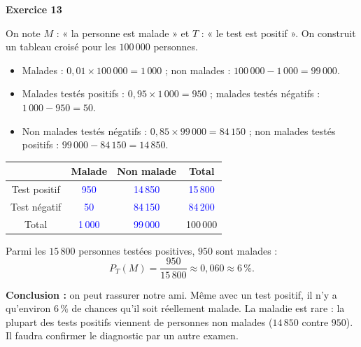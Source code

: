 \documentclass[a4paper,11pt]{article}
\newenvironment{exercice}[1]{%
  \Needspace{6\baselineskip}\par\bigskip\noindent\textbf{Exercice #1}\par\smallskip\noindent\ignorespaces
}{%
  \par
}
\newcommand{\val}[1]{\textcolor{blue}{#1}}
\begin{document}
\begin{exercice}{13}
On note $M$ : « la personne est malade » et $T$ : « le test est positif ». On construit un tableau croisé pour les $100\,000$ personnes.
\begin{itemize}[label=$\bullet$]
\item Malades : $0{,}01\times 100\,000=1\,000$ ; non malades : $100\,000-1\,000=99\,000$.
\item Malades testés positifs : $0{,}95\times 1\,000=950$ ; malades testés négatifs : $1\,000-950=50$.
\item Non malades testés négatifs : $0{,}85\times 99\,000=84\,150$ ; non malades testés positifs : $99\,000-84\,150=14\,850$.
\end{itemize}

\begin{center}
\begin{tabular}{|c|c|c|c|}
\hline
 & Malade & Non malade & Total \\ \hline
Test positif & \val{950} & \val{14\,850} & \val{15\,800} \\ \hline
Test négatif & \val{50} & \val{84\,150} & \val{84\,200} \\ \hline
Total & \val{1\,000} & \val{99\,000} & 100\,000 \\ \hline
\end{tabular}
\end{center}

Parmi les $15\,800$ personnes testées positives, $950$ sont malades :
\[P_T(M)=\dfrac{950}{15\,800}\approx 0{,}060\approx 6\,\%.\]

\textbf{Conclusion :} on peut rassurer notre ami. Même avec un test positif, il n'y a qu'environ $6\,\%$ de chances qu'il soit réellement malade. La maladie est rare : la plupart des tests positifs viennent de personnes non malades ($14\,850$ contre $950$). Il faudra confirmer le diagnostic par un autre examen.
\end{exercice}
\end{document}
